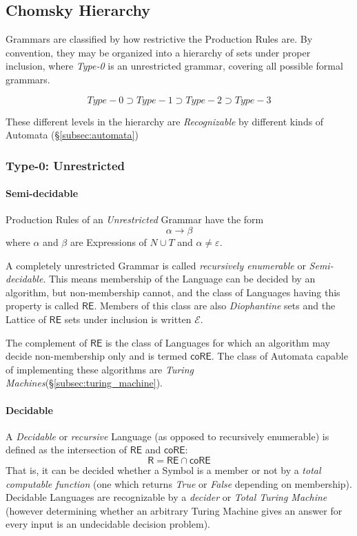 \documentclass{article}
\begin{document}
\subsection{Chomsky Hierarchy}

Grammars are classified by how restrictive the Production Rules
are. By convention, they may be organized into a hierarchy of sets
under proper inclusion, where \emph{Type-0} is an unrestricted grammar,
covering all possible formal grammars.

\[
    Type-0 \supset Type-1 \supset Type-2 \supset Type-3
\]

These different levels in the hierarchy are \emph{Recognizable} by
different kinds of Automata (\S \ref{subsec:automata})

\subsubsection{Type-0: Unrestricted}

\paragraph{Semi-decidable}\label{subsec:semidecidable}
Production Rules of an \emph{Unrestricted} Grammar have the form
\[
    \alpha \rightarrow \beta
\]
where $\alpha$ and $\beta$ are Expressions of $N \cup T$ and $\alpha
\neq \varepsilon$.

A completely unrestricted Grammar is called \emph{recursively
  enumerable} or \emph{Semi-decidable}. This means membership of the
Language can be decided by an algorithm, but non-membership cannot,
and the class of Languages having this property is called
$\mathsf{RE}$. Members of this class are also \emph{Diophantine} sets
and the Lattice of $\mathsf{RE}$ sets under inclusion is written
$\mathcal{E}$. %

The complement of $\mathsf{RE}$ is the class of Languages for which
an algorithm may decide non-membership only and is termed
$\mathsf{coRE}$. The class of Automata capable of implementing these
algorithms are \emph{Turing Machines}(\S\ref{subsec:turing_machine}).

\paragraph{Decidable}\label{subsec:decidability}
A \emph{Decidable} or \emph{recursive} Language (as opposed to
recursively enumerable) is defined as the intersection of
$\mathsf{RE}$ and $\mathsf{coRE}$:
\[
    \mathsf{R} = \mathsf{RE} \cap \mathsf{coRE}
\]
That is, it can be decided whether a Symbol is a member or not by a
\emph{total computable function} (one which returns \emph{True} or
\emph{False} depending on membership). Decidable Languages are
recognizable by a \emph{decider} or \emph{Total Turing
  Machine}\cite{kozen97} (however determining whether an arbitrary
Turing Machine gives an answer for every input is an undecidable
decision problem).
\end{document}
